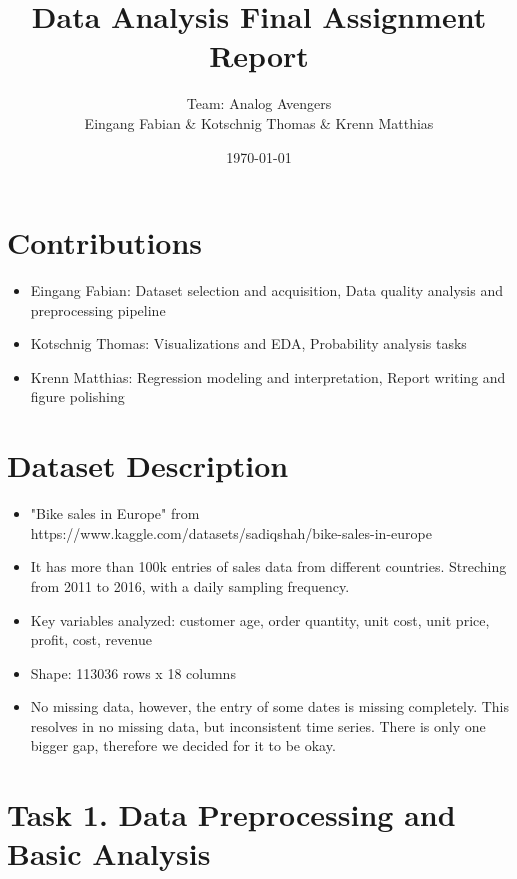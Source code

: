 \documentclass[11pt]{article}
\title{Data Analysis Final Assignment Report}
\author{%
  Team: Analog Avengers\\ 
  Eingang Fabian
  \&
  Kotschnig Thomas
  \&
  Krenn Matthias 
  }
\date{\today}
\begin{document}
\maketitle

\section{Contributions}
\begin{itemize}[leftmargin=*]
    \item Eingang Fabian: Dataset selection and acquisition, Data quality analysis and preprocessing pipeline
    \item Kotschnig Thomas: Visualizations and EDA, Probability analysis tasks
    \item Krenn Matthias: Regression modeling and interpretation, Report writing and figure polishing

\end{itemize}

\section{Dataset Description}
\begin{itemize}[leftmargin=*]
    \item "Bike sales in Europe" from https://www.kaggle.com/datasets/sadiqshah/bike-sales-in-europe
    \item It has more than 100k entries of sales data from different countries. Streching from 2011 to 2016, with a daily sampling frequency.
    \item Key variables analyzed: customer age, order quantity, unit cost, unit price, profit, cost, revenue
    \item Shape: 113036 rows x 18 columns
    \item No missing data, however, the entry of some dates is missing completely. 
    This resolves in no missing data, but inconsistent time series. 
    There is only one bigger gap, therefore we decided for it to be okay.
\end{itemize}

\section{Task 1. Data Preprocessing and Basic Analysis}
\end{document}
